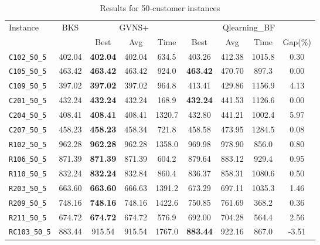 \begin{table}[ht]
\centering
\small
\setlength{\tabcolsep}{5pt}
\caption{Results for 50-customer instances}
\vspace{4mm}
\begin{adjustbox}{width=\textwidth}
\begin{tabular}{l c c c c @{\hspace{8pt}} c c c c @{\hspace{8pt}}}
\toprule
\multirow{2}{*}{Instance} & \multirow{2}{*}{BKS} & \multicolumn{3}{c}{GVNS+} & \multicolumn{4}{c}{Qlearning\_BF} \\
\cmidrule(lr){3-5} \cmidrule(lr){6-9}
 &  & Best & Avg & Time & Best & Avg & Time & Gap(\%) \\
\midrule
\texttt{C102\_50\_5} & 402.04 & \textbf{402.04} & 402.04 & 634.5 & 403.26 & 412.38 & 1015.8 & 0.30 \\
\texttt{C105\_50\_5} & 463.42 & \textbf{463.42} & 463.42 & 924.0 & \textbf{463.42} & 470.70 & 897.3 & 0.00 \\
\texttt{C109\_50\_5} & 397.02 & \textbf{397.02} & 397.02 & 964.8 & 413.41 & 429.86 & 1156.9 & 4.13 \\
\texttt{C201\_50\_5} & 432.24 & \textbf{432.24} & 432.24 & 168.9 & \textbf{432.24} & 441.53 & 1126.6 & 0.00 \\
\texttt{C204\_50\_5} & 408.41 & \textbf{408.41} & 408.41 & 1320.7 & 432.80 & 441.21 & 1002.4 & 5.97 \\
\texttt{C207\_50\_5} & 458.23 & \textbf{458.23} & 458.34 & 721.8 & 458.58 & 473.95 & 1284.5 & 0.08 \\
\texttt{R102\_50\_5} & 962.28 & \textbf{962.28} & 962.28 & 1358.0 & 969.98 & 978.90 & 856.0 & 0.80 \\
\texttt{R106\_50\_5} & 871.39 & \textbf{871.39} & 871.39 & 604.2 & 879.64 & 883.12 & 929.4 & 0.95 \\
\texttt{R110\_50\_5} & 832.24 & \textbf{832.24} & 832.84 & 860.4 & 836.37 & 858.31 & 1080.6 & 0.50 \\
\texttt{R203\_50\_5} & 663.60 & \textbf{663.60} & 666.63 & 1391.2 & 673.29 & 697.11 & 1035.3 & 1.46 \\
\texttt{R209\_50\_5} & 748.16 & \textbf{748.16} & 748.16 & 1422.6 & 750.85 & 761.69 & 368.2 & 0.36 \\
\texttt{R211\_50\_5} & 674.72 & \textbf{674.72} & 674.72 & 576.9 & 692.00 & 704.28 & 564.4 & 2.56 \\
\texttt{RC103\_50\_5} & 883.44 & 915.54 & 915.54 & 1767.0 & \textbf{883.44} & 922.16 & 867.0 & -3.51 \\

\end{tabular}
\end{adjustbox}
\end{table}
